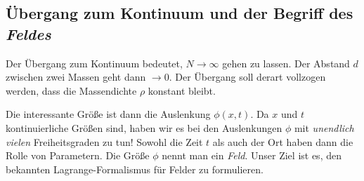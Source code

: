 \documentclass[paper=a4, fontsize=11.0pt, abstractoff, DIV12]{scrartcl}
\begin{document}
\subsection{Übergang zum Kontinuum und der Begriff des \emph{Feldes}}

Der Übergang zum Kontinuum bedeutet, $N\to\infty$ gehen zu lassen. Der
Abstand $d$ zwischen zwei Massen geht dann $\to 0$. Der Übergang soll derart
vollzogen werden, dass die Massendichte $\rho$ konstant bleibt.

Die interessante Größe ist dann die Auslenkung $\phi(x, t)$. Da $x$ und $t$
kontinuierliche Größen sind, haben wir es bei den Auslenkungen $\phi$ mit
\emph{unendlich vielen} Freiheitsgraden zu tun! Sowohl die Zeit $t$ als auch
der Ort haben dann die Rolle von Parametern. Die Größe $\phi$ nennt man ein
\emph{Feld}. Unser Ziel ist es, den bekannten Lagrange-Formalismus für
Felder zu formulieren.
\end{document}
